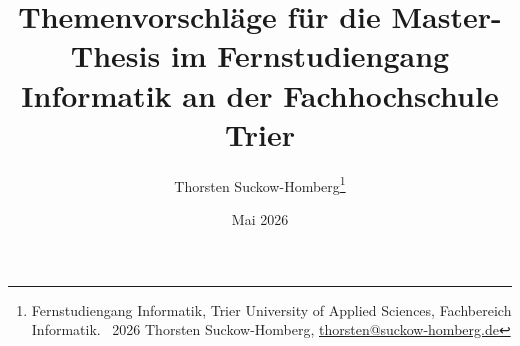 \documentclass[a4paper,abstract=true]{scrreprt}
\theoremstyle{definition}
\begin{document}
    \title{Themenvorschläge für die Master-Thesis im Fernstudiengang Informatik an der Fachhochschule Trier}

    \author{
        Thorsten Suckow-Homberg\thanks{%
          Fernstudiengang Informatik,
            Trier University of Applied Sciences, Fachbereich Informatik.
            \newline
            \textcopyright\ 2026 Thorsten Suckow-Homberg, \href{mailto:thorsten@suckow-homberg.de}{thorsten@suckow-homberg.de}
        }%
    }

    \date{Mai 2026}


    \maketitle



    \tableofcontents


    

    \clearpage
    \sloppy
    \printbibliography
    \fussy
\end{document}
